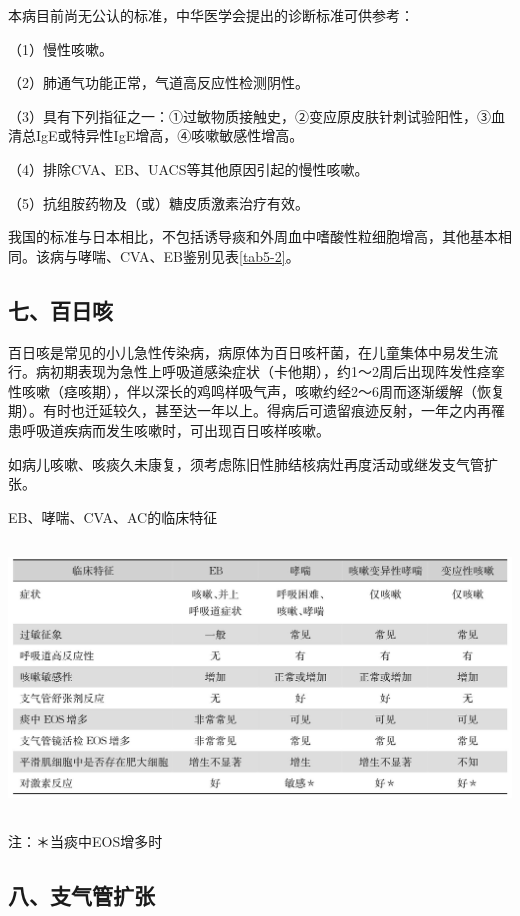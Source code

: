 本病目前尚无公认的标准，中华医学会提出的诊断标准可供参考：

（1）慢性咳嗽。

（2）肺通气功能正常，气道高反应性检测阴性。

（3）具有下列指征之一：①过敏物质接触史，②变应原皮肤针刺试验阳性，③血清总IgE或特异性IgE增高，④咳嗽敏感性增高。

（4）排除CVA、EB、UACS等其他原因引起的慢性咳嗽。

（5）抗组胺药物及（或）糖皮质激素治疗有效。

我国的标准与日本相比，不包括诱导痰和外周血中嗜酸性粒细胞增高，其他基本相同。该病与哮喘、CVA、EB鉴别见表\ref{tab5-2}。

\subsection{七、百日咳}

百日咳是常见的小儿急性传染病，病原体为百日咳杆菌，在儿童集体中易发生流行。病初期表现为急性上呼吸道感染症状（卡他期），约1～2周后出现阵发性痉挛性咳嗽（痉咳期），伴以深长的鸡鸣样吸气声，咳嗽约经2～6周而逐渐缓解（恢复期）。有时也迁延较久，甚至达一年以上。得病后可遗留痕迹反射，一年之内再罹患呼吸道疾病而发生咳嗽时，可出现百日咳样咳嗽。

如病儿咳嗽、咳痰久未康复，须考虑陈旧性肺结核病灶再度活动或继发支气管扩张。

\begin{table}[htbp]
\centering
\caption{EB、哮喘、CVA、AC的临床特征}
\label{tab5-2}
\includegraphics[width=5.9375in,height=2.83333in]{./images/Image00045.jpg}

注：＊当痰中EOS增多时
\end{table}



\subsection{八、支气管扩张}

